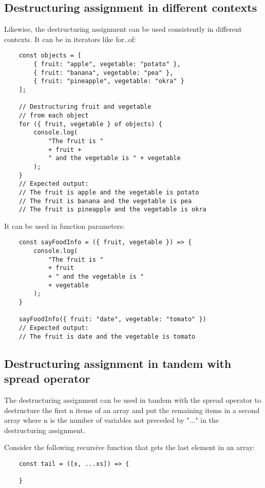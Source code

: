\documentclass[11pt,a4paper]{article}
\begin{document}
\subsection{Destructuring assignment in different contexts}
Likewise, the destructuring assignment can be used consistently in different contexts.
It can be in iterators like for..of:
\begin{verbatim}
    const objects = [
        { fruit: "apple", vegetable: "potato" },
        { fruit: "banana", vegetable: "pea" },
        { fruit: "pineapple", vegetable: "okra" }
    ];

    // Destructuring fruit and vegetable
    // from each object
    for ({ fruit, vegetable } of objects) {
        console.log(
            "The fruit is "
            + fruit +
            " and the vegetable is " + vegetable
        );
    }
    // Expected output:
    // The fruit is apple and the vegetable is potato
    // The fruit is banana and the vegetable is pea
    // The fruit is pineapple and the vegetable is okra
\end{verbatim}
It can be used in function parameters:
\begin{verbatim}
    const sayFoodInfo = ({ fruit, vegetable }) => {
        console.log(
            "The fruit is "
            + fruit
            + " and the vegetable is "
            + vegetable
        );
    }

    sayFoodInfo({ fruit: "date", vegetable: "tomato" })
    // Expected output:
    // The fruit is date and the vegetable is tomato
\end{verbatim}

\subsection{Destructuring assignment in tandem with spread operator}
The destructuring assignment can be used in tandem with the spread operator to
destructure the first n items of an array and put the remaining items in a second array
where n is the number of variables not preceded by "..." in the destructuring assignment.

Consider the following recursive function that gets the last element in an array:
\begin{verbatim}
    const tail = ([x, ...xs]) => {

    }
\end{verbatim}
\end{document}
